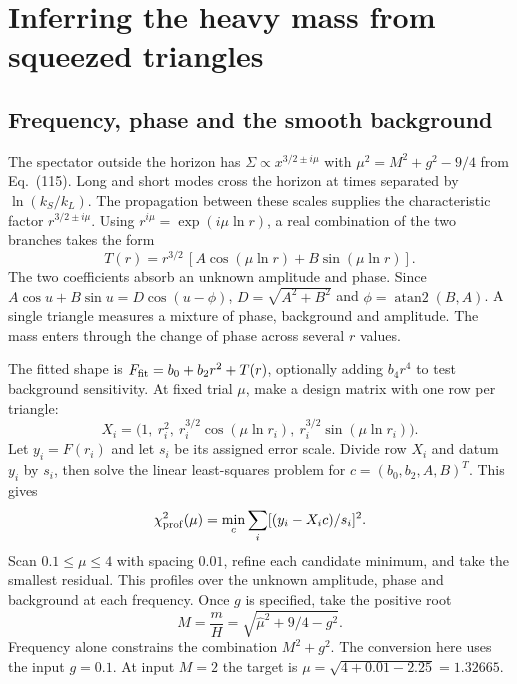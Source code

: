 \clearpage\section{Inferring the heavy mass from squeezed triangles}
\subsection{Frequency, phase and the smooth background}
The spectator outside the horizon has $\Sigma\propto x^{3/2\pm i\mu}$ with $\mu^2=M^2+g^2-9/4$ from Eq.~(115). Long and short modes cross the horizon at times separated by $\ln(k_S/k_L)$. The propagation between these scales supplies the characteristic factor $r^{3/2\pm i\mu}$. Using $r^{i\mu}=\exp(i\mu\ln r)$, a real combination of the two branches takes the form
\[
 T(r)=r^{3/2}\,[A\cos(\mu\ln r)+B\sin(\mu\ln r)].
\]
The two coefficients absorb an unknown amplitude and phase. Since $A\cos u+B\sin u=D\cos(u-\phi)$, $D=\sqrt{A^2+B^2}$ and $\phi=\operatorname{atan2}(B,A)$. A single triangle measures a mixture of phase, background and amplitude. The mass enters through the change of phase across several $r$ values.

The fitted shape is $F_{\rm fit}=b_0+b_2r^2+T(r)$, optionally adding $b_4r^4$ to test background sensitivity. At fixed trial $\mu$, make a design matrix with one row per triangle:
\[
 X_i=\big(1,\ r_i^2,\ r_i^{3/2}\cos(\mu\ln r_i),\ r_i^{3/2}\sin(\mu\ln r_i)\big).
\]
Let $y_i=F(r_i)$ and let $s_i$ be its assigned error scale. Divide row $X_i$ and datum $y_i$ by $s_i$, then solve the linear least-squares problem for $c=(b_0,b_2,A,B)^T$. This gives
\[
 \chi^2_{\rm prof}(\mu)=\min_c\sum_i[(y_i-X_i c)/s_i]^2.
\]
Scan $0.1\le\mu\le4$ with spacing $0.01$, refine each candidate minimum, and take the smallest residual. This profiles over the unknown amplitude, phase and background at each frequency. Once $g$ is specified, take the positive root
\begin{equation}
 M=\frac mH=\sqrt{\hat\mu^2+9/4-g^2}.
\end{equation}
Frequency alone constrains the combination $M^2+g^2$. The conversion here uses the input $g=0.1$. At input $M=2$ the target is $\mu=\sqrt{4+0.01-2.25}=1.32665$.

